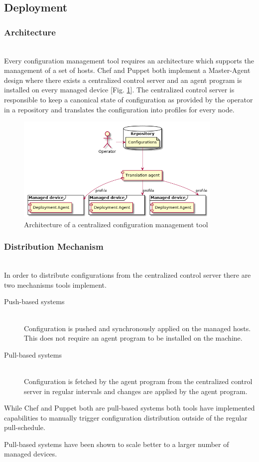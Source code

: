 \subsection{Deployment}

\subsubsection{Architecture}\hfill\\
Every configuration management tool requires an architecture which supports the management of a set of hosts. Chef and Puppet both implement a Master-Agent design where there exists a centralized control server and an agent program is installed on every managed device [Fig. \ref{fig:architecture}]. The centralized control server is responsible to keep a canonical state of configuration as provided by the operator in a repository and translates the configuration into profiles for every node.


\begin{figure}
\includegraphics[height=2in]{assets/architecture}
\caption{Architecture of a centralized configuration management tool \cite{delaet2010survey}}
\label{fig:architecture}
\end{figure}

\subsubsection{Distribution Mechanism}\hfill\\
In order to distribute configurations from the centralized control server there are two mechanisms tools implement.

\begin{description}
	
	\item[Push-based systems] \hfill \\ 
	Configuration is pushed and synchronously applied on the managed hosts. This does not require an agent program to be installed on the machine. 
	
	\item[Pull-based systems] \hfill \\
	Configuration is fetched by the agent program from the centralized control server in regular intervals and changes are applied by the agent program.
	
\end{description}

While Chef and Puppet both are pull-based systems both tools have implemented capabilities to manually trigger configuration distribution outside of the regular pull-schedule.

Pull-based systems have been shown to scale better to a larger number of managed devices.
